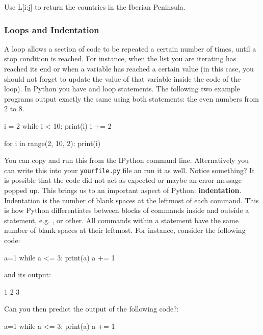 \begin{exercise}
 Use L[i:j] to return the countries in the Iberian Peninsula.
\end{exercise}

\subsubsection{Loops and Indentation}

A loop allows a section of code to be repeated a certain number of times, until
a stop condition is reached. For instance, when the list you are iterating has
reached its end or when a variable has reached a certain value (in this case,
you should not forget to update the value of that variable inside the code of
the loop). In Python you have  and  loop statements. The
following two example programs output exactly the same using both statements:
the even numbers from 2 to 8.

\begin{python}
i = 2
while i < 10:
  print(i)
  i += 2 
\end{python}

\begin{python}
for i in range(2, 10, 2):
    print(i)
\end{python}

You can copy and run this from the IPython command line. Alternatively you can write this into your \texttt{yourfile.py} file an run it as well. Notice something? It is possible that the code did not act as expected or maybe an error message popped up. This brings us to an important aspect of Python: \textbf{indentation}. Indentation is the number of blank spaces at the leftmost of each command. This is how Python differentiates between blocks of commands inside and outside a statement, e.g. ,  or other. All commands within a statement have the same number of blank spaces at their leftmost. For instance, consider the following code: 

\begin{python}
a=1
while a <= 3:
    print(a)
    a += 1
\end{python}

\noindent and its output:

\begin{python}
1
2
3
\end{python}


\begin{exercise}
Can you then predict the output of the following code?:

\begin{python}
a=1
while a <= 3:
    print(a)
a += 1
\end{python}

\end{exercise}

